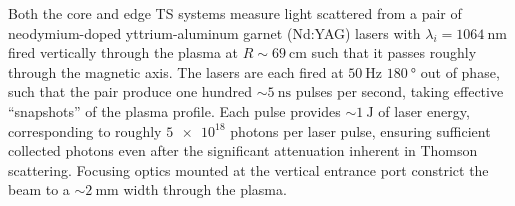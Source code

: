 \begin{figure}[p]
 \pushtooutside
\end{figure}

Both the core and edge TS systems measure light scattered from a pair of neodymium-doped yttrium-aluminum garnet (Nd:YAG) lasers with $\lambda_i = \SI{1064}{\nano\meter}$ fired vertically through the plasma at $R \sim \SI{69}{\centi\meter}$ such that it passes roughly through the magnetic axis.  The lasers are each fired at $\SI{50}{\hertz}$ $\SI{180}{\degree}$ out of phase, such that the pair produce one hundred $\sim\SI{5}{\nano\second}$ pulses per second, taking effective ``snapshots'' of the plasma profile.  Each pulse provides $\sim \SI{1}{\joule}$ of laser energy, corresponding to roughly $\num{5e18}$ photons per laser pulse, ensuring sufficient collected photons even after the significant attenuation inherent in Thomson scattering.  Focusing optics mounted at the vertical entrance port constrict the beam to a $\sim\SI{2}{\milli\meter}$ width through the plasma.

